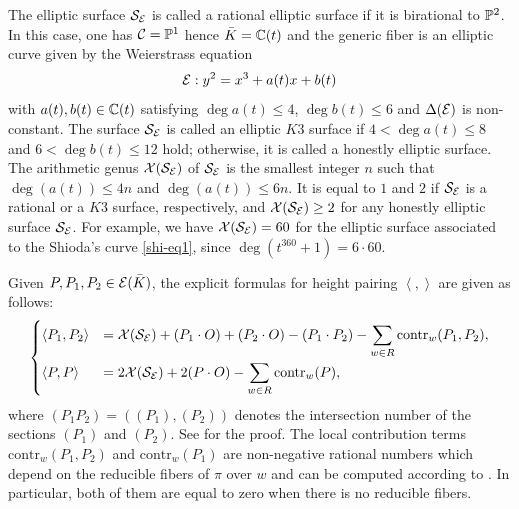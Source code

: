 \documentclass[11pt]{amsart}
\begin{document}
The elliptic surface ${\mathcal S}_{\mathcal E}$ 
is called a {\sf rational elliptic surface} if  it is birational to ${\mathbb P}^2$.
In this case, one has ${\mathcal C}={\mathbb P}^1$ hence ${{\bar K}}={\mathbb C}(t)$  and the generic fiber  
is an elliptic curve  given by the Weierstrass equation  
\begin{equation}
	\label{ell1}
	{\mathcal E}: y^2=x^3+ a(t) x + b(t)
\end{equation}
with  $a(t), b(t)\in {\mathbb C}(t)$ satisfying
$\deg a(t)\leq 4$,  $\deg b(t)\leq 6$ and  $\Delta({\mathcal E})$ is non-constant.
The  surface ${\mathcal S}_{\mathcal E}$ is  called an {\sf elliptic  $K3$ surface} if   $4<\deg a(t)\leq 8$ and  $6< \deg b(t)\leq 12$ hold;
otherwise, it is called a {\sf honestly elliptic  surface}.
The {\sf arithmetic genus}  ${\mathcal X} ({\mathcal S}_{\mathcal E})$ of ${\mathcal S}_{\mathcal E}$ is the smallest integer $n$ such that $\deg(a(t))\leq 4 n$ and $\deg(a(t))\leq 6 n$.
It is  equal to $1$ and $2$ if ${\mathcal S}_{\mathcal E}$ is a rational or a $K3$ surface, respectively,
and   ${\mathcal X} ({\mathcal S}_{\mathcal E}) \geq 2$ for  any  honestly elliptic surface ${\mathcal S}_{\mathcal E}$.
For example, we have ${\mathcal X} ({\mathcal S}_{\mathcal E}) =60$ for the elliptic surface associated to the Shioda's curve \eqref{shi-eq1}, since
$\deg( t^{360}+1)= 6\cdot 60$.


Given $P, P_1, P_2 \in {\mathcal E}({{\bar K}})$, the explicit formulas for height pairing $\left\langle ,  \right\rangle$ are given  as follows:
\begin{equation}
	\label{hf1}
	\begin{cases}
		\left\langle P_1, P_2\right\rangle &\displaystyle ={\mathcal X} ({\mathcal S}_{\mathcal E})+ (P_1\cdot O)+(P_2\cdot O)- (P_1 \cdot P_2) - \sum_{w \in R}^{} \text{contr}_{w}(P_1, P_2),\\
		\left\langle P, P\right\rangle &\displaystyle =2 {\mathcal X} ({\mathcal S}_{\mathcal E})+ 2 (P \cdot O) - \sum_{w \in R}^{} \text{contr}_{w}(P), 
	\end{cases}
\end{equation}
where  $(P_1 P_2)=((P_1), (P_2))$ denotes the intersection
number of the sections $(P_1)$ and $(P_2).$  See  \cite[Theorem 8.6]{Shioda1990a}  for the proof.
The {\sf local contribution terms} $\text{contr}_{w}(P_1, P_2)$ and 
$ \text{contr}_{w}(P_1)$ are non-negative rational numbers which  depend on the reducible fibers of $\pi$ over $w$
and  can be computed according to  \cite[Table 8.16]{Shioda1990a}.
In particular,   both of them are equal to zero when there is no reducible fibers.  
\end{document}

